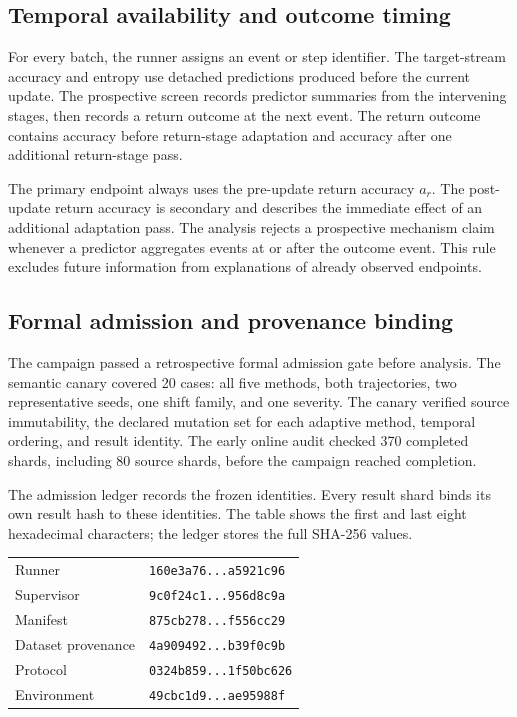 \documentclass[11pt]{article}
\begin{document}
\subsection{Temporal availability and outcome timing}
\label{sec:timing}

For every batch, the runner assigns an event or step identifier. The target-stream accuracy and entropy use detached predictions produced before the current update. The prospective screen records predictor summaries from the intervening stages, then records a return outcome at the next event. The return outcome contains accuracy before return-stage adaptation and accuracy after one additional return-stage pass.

The primary endpoint always uses the pre-update return accuracy $a_r$. The post-update return accuracy is secondary and describes the immediate effect of an additional adaptation pass. The analysis rejects a prospective mechanism claim whenever a predictor aggregates events at or after the outcome event. This rule excludes future information from explanations of already observed endpoints.

\subsection{Formal admission and provenance binding}
\label{sec:admission}

The campaign passed a retrospective formal admission gate before analysis. The semantic canary covered 20 cases: all five methods, both trajectories, two representative seeds, one shift family, and one severity. The canary verified source immutability, the declared mutation set for each adaptive method, temporal ordering, and result identity. The early online audit checked 370 completed shards, including 80 source shards, before the campaign reached completion.

The admission ledger records the frozen identities. Every result shard binds its own result hash to these identities. The table shows the first and last eight hexadecimal characters; the ledger stores the full SHA-256 values.
\begin{center}
\scriptsize
\begin{tabular}{ll}
Runner & \texttt{160e3a76...a5921c96}\\
Supervisor & \texttt{9c0f24c1...956d8c9a}\\
Manifest & \texttt{875cb278...f556cc29}\\
Dataset provenance & \texttt{4a909492...b39f0c9b}\\
Protocol & \texttt{0324b859...1f50bc626}\\
Environment & \texttt{49cbc1d9...ae95988f}
\end{tabular}
\end{center}
\end{document}
